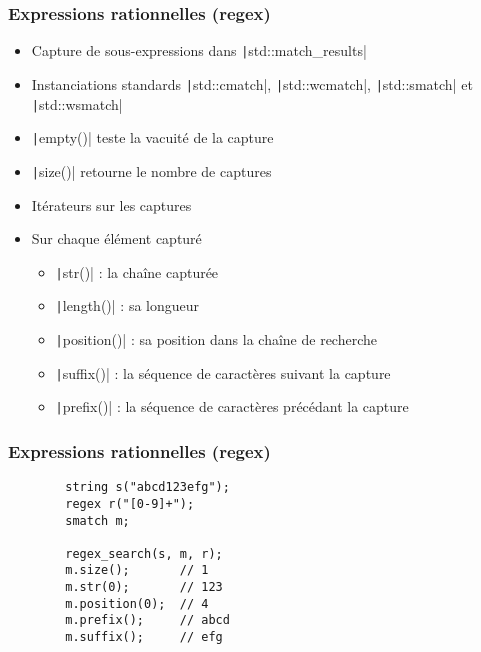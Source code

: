 \documentclass[C++.tex]{subfiles}
\begin{document}
\begin{frame}[fragile]
	\frametitle{Expressions rationnelles (regex)}
	\begin{itemize}
		\item Capture de sous-expressions dans \texttt|std::match_results|
		\item Instanciations standards \texttt|std::cmatch|, \texttt|std::wcmatch|, \texttt|std::smatch| et \texttt|std::wsmatch|
		\item \texttt|empty()| teste la vacuité de la capture
		\item \texttt|size()| retourne le nombre de captures
		\item Itérateurs sur les captures
		\item Sur chaque élément capturé
		\begin{itemize}
			\item \texttt|str()| : la chaîne capturée
			\item \texttt|length()| : sa longueur
			\item \texttt|position()| : sa position dans la chaîne de recherche
			\item \texttt|suffix()| : la séquence de caractères suivant la capture
			\item \texttt|prefix()| : la séquence de caractères précédant la capture
		\end{itemize}
	\end{itemize}
\end{frame}

\begin{frame}[fragile]
	\frametitle{Expressions rationnelles (regex)}
	\begin{verbatim}
		string s("abcd123efg");
		regex r("[0-9]+");
		smatch m;

		regex_search(s, m, r);
		m.size();       // 1
		m.str(0);       // 123
		m.position(0);  // 4
		m.prefix();     // abcd
		m.suffix();     // efg
	\end{verbatim}
\end{frame}
\end{document}
